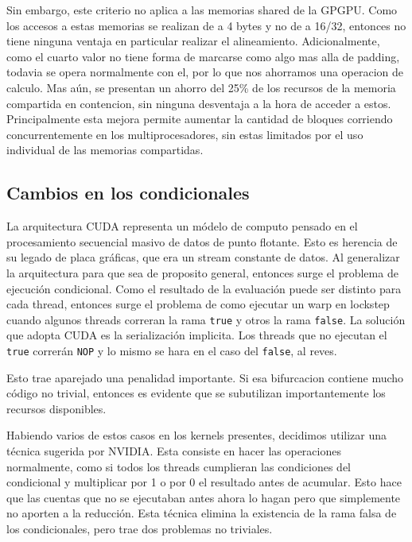Sin embargo, este criterio no aplica a las memorias shared de la GPGPU. Como los accesos
a estas memorias se realizan de a 4 bytes y no de a 16/32, entonces no tiene ninguna ventaja
en particular realizar el alineamiento. Adicionalmente, como el cuarto valor no tiene forma de marcarse
como algo mas alla de padding, todavia se opera normalmente con el, por lo que nos ahorramos una
operacion de calculo. Mas a\'un, se presentan un ahorro del 25\% de los recursos de la memoria compartida
en contencion, sin ninguna desventaja a la hora de acceder a estos. Principalmente
esta mejora permite aumentar la cantidad de bloques corriendo concurrentemente en los multiprocesadores,
sin estas limitados por el uso individual de las memorias compartidas.

\subsection{Cambios en los condicionales}
La arquitectura CUDA representa un m\'odelo de computo pensado en el procesamiento secuencial masivo
de datos de punto flotante. Esto es herencia de su legado de placa gr\'aficas, que era un stream
constante de datos. Al generalizar la arquitectura para que sea de proposito general, entonces
surge el problema de ejecuci\'on condicional. Como el resultado de la evaluaci\'on puede ser distinto
para cada thread, entonces surge el problema de como ejecutar un warp en lockstep cuando algunos threads
correran la rama \texttt{true} y otros la rama \texttt{false}. La soluci\'on que adopta CUDA es la
serializaci\'on implicita. Los threads que no ejecutan el \texttt{true} correr\'an \texttt{NOP}
y lo mismo se hara en el caso del \texttt{false}, al reves.

Esto trae aparejado una penalidad importante. Si esa bifurcacion contiene mucho c\'odigo no trivial,
entonces es evidente que se subutilizan importantemente los recursos disponibles.

Habiendo varios de estos casos en los kernels presentes, decidimos utilizar una t\'ecnica sugerida
por NVIDIA. Esta consiste en hacer las operaciones normalmente, como si todos los threads cumplieran
las condiciones del condicional y multiplicar por 1 o por 0 el resultado antes de acumular.
Esto hace que las cuentas que no se ejecutaban antes ahora lo hagan pero que simplemente no aporten
a la reducci\'on. Esta t\'ecnica elimina la existencia de la rama falsa de los condicionales, pero
trae dos problemas no triviales.

